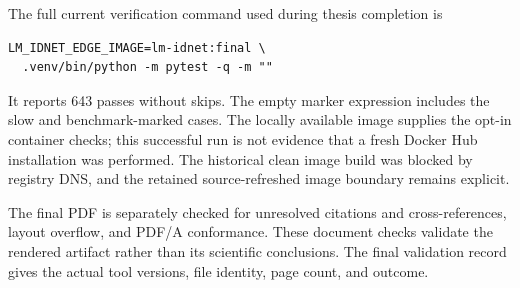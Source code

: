 The full current verification command used during thesis completion is
\begin{verbatim}
LM_IDNET_EDGE_IMAGE=lm-idnet:final \
  .venv/bin/python -m pytest -q -m ""
\end{verbatim}
It reports 643 passes without skips. The empty marker expression
includes the slow and benchmark-marked cases. The locally available
image supplies the opt-in container checks; this successful run is
not evidence that a fresh Docker Hub installation was performed.
The historical clean image build was blocked by registry DNS, and
the retained source-refreshed image boundary remains explicit.

The final PDF is separately checked for unresolved citations and
cross-references, layout overflow, and PDF/A conformance. These
document checks validate the rendered artifact rather than its
scientific conclusions. The final validation record gives the
actual tool versions, file identity, page count, and outcome.
